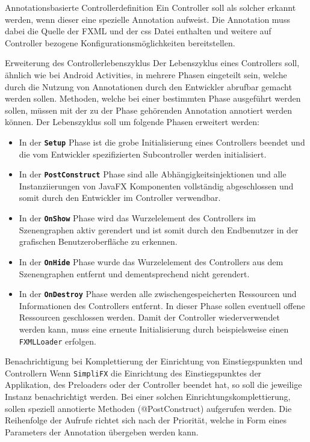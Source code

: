 \begin{freq}{Annotationsbasierte Controllerdefinition}
	Ein Controller soll als solcher erkannt werden, wenn dieser eine spezielle Annotation aufweist. Die Annotation muss dabei die Quelle der FXML und der \ac{css} Datei enthalten und weitere auf Controller bezogene Konfigurationsmöglichkeiten bereitstellen.
\end{freq}
\begin{freq}{Erweiterung des Controllerlebenszyklus}
	Der Lebenszyklus eines Controllers soll, ähnlich wie bei Android Activities, in mehrere Phasen eingeteilt sein, welche durch die Nutzung von Annotationen durch den Entwickler abrufbar gemacht werden sollen. Methoden, welche bei einer bestimmten Phase ausgeführt werden sollen, müssen mit der zu der Phase gehörenden Annotation annotiert werden können. Der Lebenszyklus soll um folgende Phasen erweitert werden:
	\begin{itemize}
		\item In der \textbf{\texttt{Setup}} Phase ist die grobe Initialisierung eines Controllers beendet und die vom Entwickler spezifizierten Subcontroller werden initialisiert.
		\item In der \textbf{\texttt{PostConstruct}} Phase sind alle Abhängigkeitsinjektionen und alle Instanziierungen von JavaFX Komponenten vollständig abgeschlossen und somit durch den Entwickler im Controller verwendbar.
		\item In der \textbf{\texttt{OnShow}} Phase wird das Wurzelelement des Controllers im Szenengraphen aktiv gerendert und ist somit durch den Endbenutzer in der grafischen Benutzeroberfläche zu erkennen.
		\item In der \textbf{\texttt{OnHide}} Phase wurde das Wurzelelement des Controllers aus dem Szenengraphen entfernt und dementsprechend nicht gerendert.
		\item In der \textbf{\texttt{OnDestroy}} Phase werden alle zwischengespeicherten Ressourcen und Informationen des Controllers entfernt. In dieser Phase sollen eventuell offene Ressourcen geschlossen werden. Damit der Controller wiederverwendet werden kann, muss eine erneute Initialisierung durch beispielsweise einen \texttt{FXMLLoader} erfolgen.
	\end{itemize}
\end{freq}
\begin{freq}{Benachrichtigung bei Komplettierung der Einrichtung von Einstiegspunkten und Controllern}
	Wenn \texttt{SimpliFX} die Einrichtung des Einstiegspunktes der Applikation, des Preloaders oder der Controller beendet hat, so soll die jeweilige Instanz benachrichtigt werden. Bei einer solchen Einrichtungskomplettierung, sollen speziell annotierte Methoden (@PostConstruct) aufgerufen werden. Die Reihenfolge der Aufrufe richtet sich nach der Priorität, welche in Form eines Parameters der Annotation übergeben werden kann.
\end{freq}
